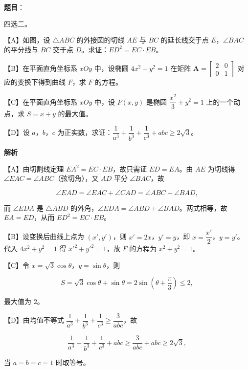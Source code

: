 \begin{answer}

\textbf{题目}：

四选二。

【A】如图，设 $\triangle ABC$ 的外接圆的切线 $AE$ 与 $BC$ 的延长线交于点 $E$，$\angle BAC$ 的平分线与 $BC$ 交于点 $D$。求证：$ED^2=EC\cdot EB$。
\nopagebreak[4]
\begin{center}\end{center}
\nopagebreak[4]
【B】在平面直角坐标系 $xOy$ 中，设椭圆 $4x^2+y^2=1$ 在矩阵 $\boldsymbol A=\begin{bmatrix}2&0\\0&1\end{bmatrix}$ 对应的变换下得到曲线 $F$，求 $F$ 的方程。

【C】在平面直角坐标系 $xOy$ 中，设 $P(x,y)$ 是椭圆 $\dfrac{x^2}3+y^2=1$ 上的一个动点，求 $S=x+y$ 的最大值。

【D】设 $a$，$b$，$c$ 为正实数，求证：$\dfrac1{a^3}+\dfrac1{b^3}+\dfrac1{c^3}+abc\geqslant2\sqrt3$。

\textbf{解析}

【A】由切割线定理 $EA^2=EC\cdot EB$，故只需证 $ED=EA$。由 $AE$ 为切线得 $\angle EAC=\angle ABC$（弦切角），又 $AD$ 平分 $\angle BAC$，故

\nopagebreak[4]
\[\angle EAD=\angle EAC+\angle CAD=\angle ABC+\angle BAD,\]

而 $\angle EDA$ 是 $\triangle ABD$ 的外角，$\angle EDA=\angle ABD+\angle BAD$。两式相等，故 $EA=ED$，从而 $ED^2=EC\cdot EB$。

【B】设变换后曲线上点为 $(x',y')$，则 $x'=2x$，$y'=y$，即 $x=\dfrac{x'}2$，$y=y'$。代入 $4x^2+y^2=1$ 得 $x'^2+y'^2=1$，故 $F$ 的方程为 $x^2+y^2=1$。

【C】令 $x=\sqrt3\cos\theta$，$y=\sin\theta$，则

\nopagebreak[4]
\[S=\sqrt3\cos\theta+\sin\theta=2\sin\left(\theta+\frac{\pi}3\right)\leqslant2,\]

最大值为 $2$。

【D】由均值不等式 $\dfrac1{a^3}+\dfrac1{b^3}+\dfrac1{c^3}\geqslant\dfrac3{abc}$，故

\nopagebreak[4]
\[\frac1{a^3}+\frac1{b^3}+\frac1{c^3}+abc\geqslant\frac3{abc}+abc\geqslant2\sqrt3,\]

当 $a=b=c=1$ 时取等号。


\end{answer}
